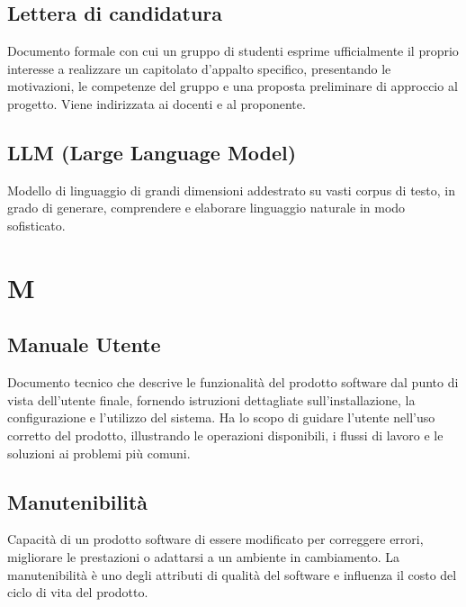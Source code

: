 \documentclass[a4paper,11pt]{article}
\begin{document}
\subsection{Lettera di candidatura}
Documento formale con cui un gruppo di studenti esprime ufficialmente il proprio interesse a realizzare un capitolato d'appalto specifico, presentando le motivazioni, le competenze del gruppo e una proposta preliminare di approccio al progetto. Viene indirizzata ai docenti e al proponente.









\subsection{LLM (Large Language Model)}
Modello di linguaggio di grandi dimensioni addestrato su vasti corpus di testo, in grado di generare, comprendere e elaborare linguaggio naturale in modo sofisticato.

\newpage









\section{M}

\subsection{Manuale Utente}
Documento tecnico che descrive le funzionalità del prodotto software dal punto di vista dell'utente finale, fornendo istruzioni dettagliate sull'installazione, la configurazione e l'utilizzo del sistema. Ha lo scopo di guidare l'utente nell'uso corretto del prodotto, illustrando le operazioni disponibili, i flussi di lavoro e le soluzioni ai problemi più comuni.




\subsection{Manutenibilità}
Capacità di un prodotto software di essere modificato per correggere errori, migliorare le prestazioni o adattarsi a un ambiente in cambiamento. La manutenibilità è uno degli attributi di qualità del software e influenza il costo del ciclo di vita del prodotto.
\end{document}
